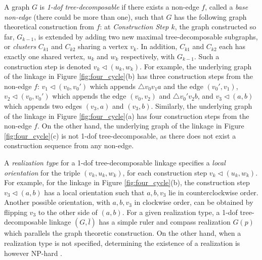 \documentclass[prodmode,acmtoms]{acmsmall}
\begin{document}
A graph $G$ is \emph{1-dof tree-decomposable} if there exists a non-edge $f$, 
called a \emph{base non-edge} (there could be more than one), 
such that $G$ has the following graph theoretical construction from $f$:
at {\emph{Construction Step $k$}}, 
the graph constructed so far, $G_{k-1}$, is extended by
adding two new maximal tree-decomposable subgraphs, or \emph{clusters} $C_{k1}$ and $C_{k2}$ sharing a vertex $v_{k}$. 
In addition, $C_{k1}$ and $C_{k2}$ each has exactly one shared vertex, $u_k$ and $w_k$ respectively, 
with $G_{k-1}$. Such a construction step is denoted $v_k \triangleleft (u_k,w_k)$.
For example, the underlying graph of the linkage in Figure \ref{fig:four_cycle}(b) has three construction steps from the non-edge $f$:
$v_1 \triangleleft (v_0,v_0')$ which appends $\triangle v_0v_1a$ and the edge $(v_0',v_1)$,
$v_2 \triangleleft (v_0,v_0')$ which appends the edge $(v_0,v_2)$ and  $\triangle v_0'v_2b$, 
and $v_3 \triangleleft (a,b)$ which appends two edges $(v_3, a)$ and $(v_3, b)$.
Similarly, the underlying graph of the linkage in Figure \ref{fig:four_cycle}(a) has four construction steps from the non-edge $f$.
On the other hand, the underlying graph of the linkage in Figure \ref{fig:four_cycle}(c) is not 1-dof tree-decomposable, as there does not exist a construction sequence from any non-edge. 

A \emph{realization type} for a 1-dof tree-decomposable linkage 
specifies a \emph{local orientation} for the triple $(v_k,u_k,w_k)$,
for each construction step  $v_k \triangleleft (u_k,w_k)$. 
For example, for the linkage in Figure \ref{fig:four_cycle}(b), 
the construction step $v_3 \triangleleft (a,b)$ has a local orientation such that $a,b,v_3$ lie in counterclockwise order. Another possible orientation, with $a,b,v_3$ in clockwise order, can be obtained by flipping $v_3$ to the other side of $(a,b)$. 
For a given realization type, 
a 1-dof tree-decomposable linkage $(G,\bar{l})$ has a simple ruler and compass realization $G(p)$
which parallels the graph theoretic construction. 
On the other hand, when a realization type is not specified, 
determining the existence of a realization is however NP-hard \citep{Sacks2010}. 
\end{document}
